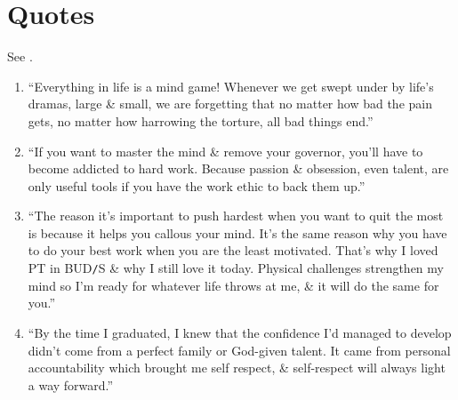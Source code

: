 \documentclass{article}
\numberwithin{equation}{section}
\begin{document}
\section{Quotes}
See \cite{Goggins2018}.
\begin{enumerate}
	\item ``Everything in life is a mind game! Whenever we get swept under by life's dramas, large \& small, we are forgetting that no matter how bad the pain gets, no matter how harrowing the torture, all bad things end.''
	\item ``If you want to master the mind \& remove your governor, you'll have to become addicted to hard work. Because passion \& obsession, even talent, are only useful tools if you have the work ethic to back them up.''
	\item ``The reason it's important to push hardest when you want to quit the most is because it helps you callous your mind. It's the same reason why you have to do your best work when you are the least motivated. That's why I loved PT in BUD\texttt{/}S \& why I still love it today. Physical challenges strengthen my mind so I'm ready for whatever life throws at me, \& it will do the same for you.''
	\item ``By the time I graduated, I knew that the confidence I'd managed to develop didn't come from a perfect family or God-given talent. It came from personal accountability which brought me self respect, \& self-respect will always light a way forward.''
\end{enumerate}


\printbibliography[heading=bibintoc]
	
\end{document}
